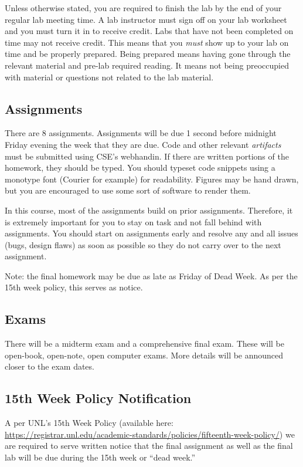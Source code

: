 \documentclass[12pt]{scrartcl}
\begin{document}
Unless otherwise stated, you are required to finish the lab by 
the end of your regular lab meeting time.  A lab instructor must 
sign off on your lab worksheet and you must turn it in to receive 
credit.  Labs that have not been completed on time may not receive
credit. This means that you \emph{must} show up to your lab on
time and be properly prepared.  Being prepared means having gone
through the relevant material and pre-lab required reading.  It 
means not being preoccupied with material or questions not related
to the lab material.  

\subsection{Assignments}

There are 8 assignments.  Assignments will be due 1 second before 
midnight Friday evening the week that they are due.  Code and other 
relevant \emph{artifacts} must be submitted using CSE's webhandin.  
If there are written portions of the homework, they should be typed.  
You should typeset code snippets using a monotype font (Courier for 
example) for readability.  Figures may be hand drawn, but you are 
encouraged to use some sort of software to render them.  

In this course, most of the assignments build on prior assignments.  
Therefore, it is extremely important for you to stay on task and not 
fall behind with assignments.  You should start on assignments early 
and resolve any and all issues (bugs, design flaws) as soon as 
possible so they do not carry over to the next assignment.

Note: the final homework may be due as late as Friday of Dead Week.  
As per the 15th week policy, this serves as notice.

\subsection{Exams}

There will be a midterm exam and a comprehensive final exam.  These
will be open-book, open-note, open computer exams.  More details will 
be announced closer to the exam dates.

\subsection{15th Week Policy Notification}
\label{subsection:deadweek}

A per UNL's 15th Week Policy (available here: \url{https://registrar.unl.edu/academic-standards/policies/fifteenth-week-policy/}) we are required
to serve written notice that the final assignment
as well as the final lab will be due during the 15th 
week or ``dead week.''
\end{document}
